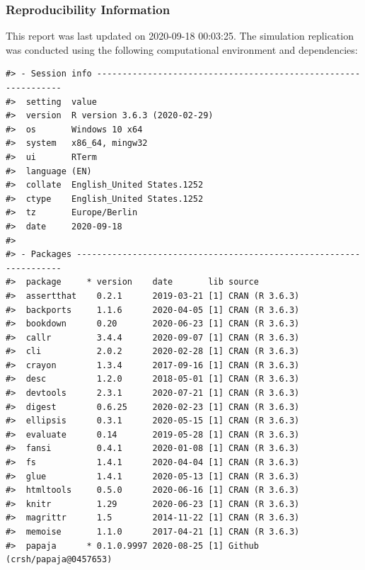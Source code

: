 \documentclass[
  english,
  doc,floatsintext,draftall]{apa6}
\begin{document}
\hypertarget{reproducibility-information}{%
\subsubsection{Reproducibility Information}\label{reproducibility-information}}

This report was last updated on 2020-09-18 00:03:25.
The simulation replication was conducted using the following computational environment and dependencies:
\FloatBarrier

\begin{verbatim}
#> - Session info ---------------------------------------------------------------
#>  setting  value                       
#>  version  R version 3.6.3 (2020-02-29)
#>  os       Windows 10 x64              
#>  system   x86_64, mingw32             
#>  ui       RTerm                       
#>  language (EN)                        
#>  collate  English_United States.1252  
#>  ctype    English_United States.1252  
#>  tz       Europe/Berlin               
#>  date     2020-09-18                  
#> 
#> - Packages -------------------------------------------------------------------
#>  package     * version    date       lib source                      
#>  assertthat    0.2.1      2019-03-21 [1] CRAN (R 3.6.3)              
#>  backports     1.1.6      2020-04-05 [1] CRAN (R 3.6.3)              
#>  bookdown      0.20       2020-06-23 [1] CRAN (R 3.6.3)              
#>  callr         3.4.4      2020-09-07 [1] CRAN (R 3.6.3)              
#>  cli           2.0.2      2020-02-28 [1] CRAN (R 3.6.3)              
#>  crayon        1.3.4      2017-09-16 [1] CRAN (R 3.6.3)              
#>  desc          1.2.0      2018-05-01 [1] CRAN (R 3.6.3)              
#>  devtools      2.3.1      2020-07-21 [1] CRAN (R 3.6.3)              
#>  digest        0.6.25     2020-02-23 [1] CRAN (R 3.6.3)              
#>  ellipsis      0.3.1      2020-05-15 [1] CRAN (R 3.6.3)              
#>  evaluate      0.14       2019-05-28 [1] CRAN (R 3.6.3)              
#>  fansi         0.4.1      2020-01-08 [1] CRAN (R 3.6.3)              
#>  fs            1.4.1      2020-04-04 [1] CRAN (R 3.6.3)              
#>  glue          1.4.1      2020-05-13 [1] CRAN (R 3.6.3)              
#>  htmltools     0.5.0      2020-06-16 [1] CRAN (R 3.6.3)              
#>  knitr         1.29       2020-06-23 [1] CRAN (R 3.6.3)              
#>  magrittr      1.5        2014-11-22 [1] CRAN (R 3.6.3)              
#>  memoise       1.1.0      2017-04-21 [1] CRAN (R 3.6.3)              
#>  papaja      * 0.1.0.9997 2020-08-25 [1] Github (crsh/papaja@0457653)

\end{verbatim}
\end{document}
